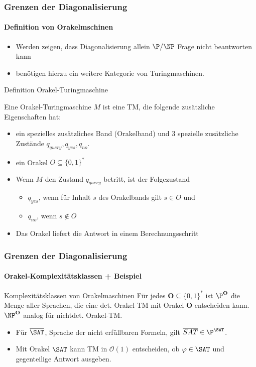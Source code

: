 \begin{frame}
	\frametitle{Grenzen der Diagonalisierung}
	\framesubtitle{Definition von Orakelmschinen}
	\begin{itemize}
		\item Werden zeigen, dass Diagonalisierung allein $\P/\NP$ Frage nicht beantworten kann
		\item benötigen hierzu ein weitere Kategorie von Turingmaschinen. 
	\end{itemize}
	\begin{KITinfoblock}{Definition Orakel-Turingmaschine} {
			Eine Orakel-Turingmaschine $M$ ist eine TM, die folgende zusätzliche Eigenschaften hat:
			\begin{itemize}
				\item<2-> ein spezielles zusätzliches Band (Orakelband) und 3 spezielle zusätzliche Zustände $q_{query}, q_{yes}, q_{no}$.
				\item <3-> ein Orakel $O \subseteq \{0,1\}^*$
				\item <4-> Wenn $M$ den Zustand $q_{query}$ betritt, ist der Folgezustand
					\begin{itemize}
					\item $q_{yes}$, wenn für Inhalt $s$ des Orakelbands gilt $s \in O$ und
				    \item	$q_{no}$, wenn  $s \notin O$ 
					\end{itemize} 
				\item<5-> Das Orakel liefert die Antwort \alert{in einem Berechnungsschritt}
			\end{itemize}
		}
	\end{KITinfoblock}
\end{frame}
\begin{frame} 
	\frametitle{Grenzen der Diagonalisierung}
	\framesubtitle{Orakel-Komplexitätsklassen + Beispiel}
	\begin{KITinfoblock}{Komplexitätsklassen von Orakelmaschinen}
		Für jedes $\mathbf{O} \subseteq \{0,1\}^*$ ist ${\P}^{\mathbf{O}}$ die Menge
		aller Sprachen, die eine det. Orakel-TM mit Orakel $\mathbf{O}$ entscheiden
		kann.
		${\NP}^{\mathbf{O}}$ analog für nichtdet. Orakel-TM.
		
	\end{KITinfoblock}
	\pause
	\heading{$\overline{\SAT}$}
	\begin{itemize}[<+->]
		\item   Für $\overline{\SAT}$, Sprache der nicht erfüllbaren Formeln, gilt
		$\overline{SAT} \in {\P}^{\SAT}$.
		\item   Mit  Orakel $\SAT$ kann TM in $\mathcal{O}(1)$ entscheiden, ob
		$\varphi \in \SAT$ und gegenteilige Antwort ausgeben.
	\end{itemize}
	
\end{frame}
